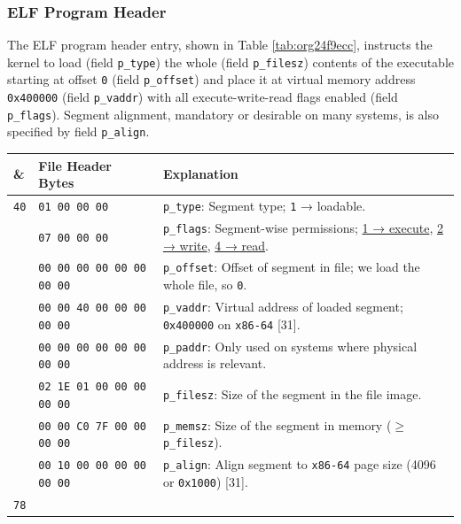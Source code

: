 \documentclass[a4paper,12pt,final]{article}
\makeatletter
\newcommand{\citeprocitem}[2]{\hyper@linkstart{cite}{citeproc_bib_item_#1}#2\hyper@linkend}
\makeatother
\begin{document}
\subsubsection{ELF Program Header}
\label{sec:orgaa28a96}

The ELF program header entry, shown in Table \ref{tab:org24f9ecc},
instructs the kernel to load (field \texttt{p\_type}) the whole (field
\texttt{p\_filesz}) contents of the executable starting at offset \texttt{0} (field
\texttt{p\_offset}) and place it at virtual memory address \texttt{0x400000} (field
\texttt{p\_vaddr}) with all execute-write-read flags enabled (field
\texttt{p\_flags}).  Segment alignment, mandatory or desirable on many
systems, is also specified by field \texttt{p\_align}.

\begin{table}[!htbp] \begin{adjustwidth}{-1cm}{-1cm} \fontsize{9}{10.800000}\selectfont
\begin{center}
\begin{tabular}{l|l|l}
\textbf{\&} & \textbf{File Header Bytes} & \textbf{Explanation}\\[0pt]
\hline
\texttt{40} & \hspace{0.000000em}​\texttt{01 00 00 00} & \texttt{p\_type}: Segment type; \texttt{1} → loadable.\\[0pt]
 & \hspace{6.318000em}​\texttt{07 00 00 00} & \texttt{p\_flags}: Segment-wise permissions; \uline{1 → execute}, \uline{2 → write}, \uline{4 → read}.\\[0pt]
 & \hspace{0.000000em}​\texttt{00 00 00 00 00 00 00 00} & \texttt{p\_offset}: Offset of segment in file; we load the whole file, so \texttt{0}.\\[0pt]
 & \hspace{0.000000em}​\texttt{00 00 40 00 00 00 00 00} & \texttt{p\_vaddr}: Virtual address of loaded segment; \texttt{0x400000} on \texttt{x86-64} \citeprocitem{31}{[31]}.\\[0pt]
 & \hspace{0.000000em}​\texttt{00 00 00 00 00 00 00 00} & \texttt{p\_paddr}: Only used on systems where physical address is relevant.\\[0pt]
 & \hspace{0.000000em}​\texttt{02 1E 01 00 00 00 00 00} & \texttt{p\_filesz}: Size of the segment in the file image.\\[0pt]
 & \hspace{0.000000em}​\texttt{00 00 C0 7F 00 00 00 00} & \texttt{p\_memsz}: Size of the segment in memory (\(\ge\) \texttt{p\_filesz}).\\[0pt]
 & \hspace{0.000000em}​\texttt{00 10 00 00 00 00 00 00} & \texttt{p\_align}: Align segment to \texttt{x86-64} page size (4096 or \texttt{0x1000}) \citeprocitem{31}{[31]}.\\[0pt]
\hline
\texttt{78} &  & \\[0pt]
\end{tabular}


\end{center}
\end{adjustwidth}
\end{table}
\end{document}
